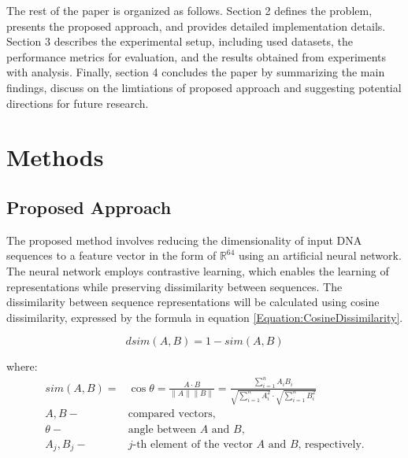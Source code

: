 \documentclass[pdflatex,sn-vancouver-num]{sn-jnl}%
\begin{document}
    The rest of the paper is organized as follows. Section 2 defines the problem, presents the proposed approach, and provides detailed implementation details.
    Section 3 describes the experimental setup, including used datasets, the performance metrics for evaluation, and the results obtained from experiments with analysis.
    Finally, section 4 concludes the paper by summarizing the main findings, discuss on the limtiations of proposed approach and suggesting potential directions for future research.

    \section{Methods}




    \subsection{ Proposed Approach}

    The proposed method involves reducing the dimensionality of input DNA sequences to a feature vector in the form of $\mathbb{R}^{64}$ using an artificial neural network.
    The neural network employs contrastive learning, which enables the learning of representations while preserving dissimilarity between sequences.
    The dissimilarity between sequence representations will be calculated using cosine dissimilarity, expressed by the formula in equation \eqref{Equation:CosineDissimilarity}.

            \begin{equation}
                dsim(A, B) = 1 - sim(A, B)
                \label{Equation:CosineDissimilarity}
            \end{equation}

            where:
            \begin{align*}
                sim(A, B) =& \cos{\theta} = \frac{A \cdot B}{\|A\| \|B\|} = \frac{
                    \sum^{n}_{i = 1}A_i B_i
                }{
                    \sqrt{
                        \sum^{n}_{i = 1}A_i^2
                    }
                    \cdot
                    \sqrt{
                        \sum^{n}_{i = 1}B_i^2
                    }
                } \\
                A, B -& \text{compared vectors,} \\
                \theta -& \text{angle between $A$ and $B$,} \\
                A_j, B_j -& \text{$j$-th element of the vector $A$ and $B$, respectively.}
            \end{align*}
\end{document}
